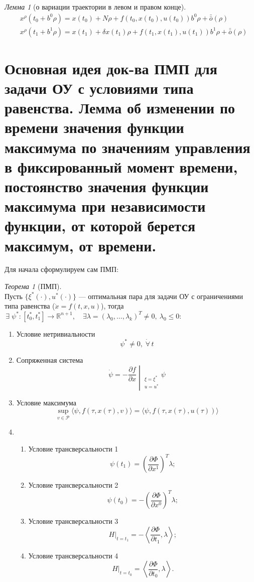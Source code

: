 \documentclass[oneside, final, 14pt, draft]{article}
\theoremstyle{definition}
\theoremstyle{definition}
\theoremstyle{remark}
\theoremstyle{theorem}
\newtheorem{thm}{Теорема}[section]
\newtheorem{lem}{Лемма}[section]
\renewcommand{\leq}{\leqslant}
\begin{document}
\begin{lem}[о вариации траектории в левом и правом конце]\ \\
\begin{align*}
&x^{\rho}(t_0 + b^0\rho) = x(t_0) +N\rho +f(t_0, x(t_0), u(t_0))b^0\rho + \bar{\bar{o}}(\rho)\\
&x^{\rho}(t_1 + b^1\rho) = x(t_1) +\delta x(t_1)  \rho +f(t_1, x(t_1), u(t_1))b^1\rho + \bar{\bar{o}}(\rho)
\end{align*}
\end{lem}

\section{Основная идея док-ва ПМП для задачи ОУ с условиями типа равенства. Лемма об изменении по времени значения функции максимума по значениям управления в фиксированный момент времени, постоянство значения функции максимума при независимости функции, от которой берется максимум, от времени.}
Для начала сформулируем сам ПМП:
\begin{thm}[ПМП]
\ \\
    Пусть $\{ \xi^*(\cdot), u^*(\cdot)\}$ --- оптимальная пара для задачи ОУ с ограничениями типа равенства ($\dot{x} = f(t, x, u)$), тогда 
    $ \,\exists\; \psi^*: \left[t_0^*, t_1^*\right] \rightarrow \mathbb{R}^{n+1}, \quad \exists \lambda = (\lambda_0, \ldots, \lambda_k)^T \neq 0, \ \lambda_0\leq 0$:
    \begin{enumerate}
    	\item Условие нетривиальности
    	$$\psi^* \neq 0,\; \dot\forall\, t$$
        \item Сопряженная система
        $$
        \dot{\psi} = - \left. \frac{\partial f}{\partial x} \middle|_{\substack{\xi = \xi^*\\ u = u^*}}\psi\right.
        $$
        \item Условие максимума
        $$
        \sup\limits_{v \in \mathcal{P}} \langle \psi, f(\tau, x(\tau), v)\rangle = \langle \psi, f(\tau, x(\tau), u(\tau))\rangle
        $$
        \item 
            \begin{enumerate}
            \item Условие трансверсальности 1
            $$
            \psi(t_1) = \left(\frac{\partial \Phi}{\partial x^1}\right)^T \lambda;
            $$
            \item Условие трансверсальности 2
            $$
            \psi(t_0) = -\left(\frac{\partial \Phi}{\partial x^0}\right)^T \lambda;
            $$
            \item Условие трансверсальности 3
            $$
            \left. H \right|_{t=t_1} = -\left\langle \frac{\partial \Phi}{\partial t_1}, \lambda \right\rangle;
            $$
            \item Условие трансверсальности 4
            $$
            \left. H \right|_{t=t_0} = \left\langle \frac{\partial \Phi}{\partial t_0}, \lambda \right\rangle.
            $$
            \end{enumerate}
    \end{enumerate}
\end{thm}
\end{document}
